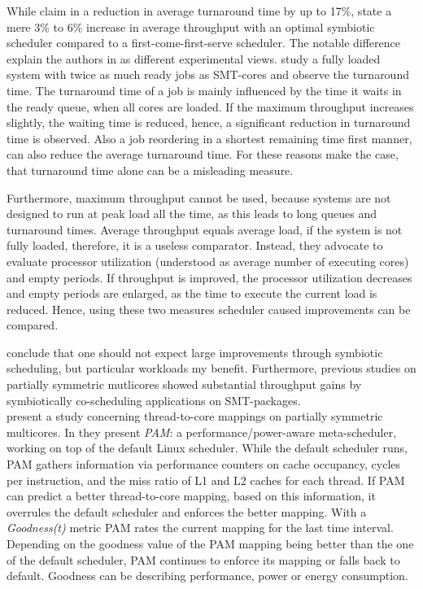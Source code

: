 While \citeauthor{snavely_symbiotic_2000} claim in
\cite{snavely_symbiotic_2000} a reduction in average turnaround time by up to
17\%, \citeauthor{eyerman_revisiting_2015} state a mere 3\% to 6\% increase in
average throughput with an optimal symbiotic scheduler compared to a
first-come-first-serve scheduler.
The notable difference explain the authors in \cite{eyerman_revisiting_2015} as
different experimental views. \citeauthor{snavely_symbiotic_2000} study a fully
loaded system with twice as much ready jobs as SMT-cores and observe the
turnaround time.
The turnaround time of a job is mainly influenced by the time it waits in the
ready queue, when all cores are loaded.
If the maximum throughput increases slightly, the waiting time is reduced,
hence, a significant reduction in turnaround time is observed.
Also a job reordering in a shortest remaining time first manner, can also
reduce the average turnaround time.
For these reasons \citeauthor{eyerman_revisiting_2015} make the case,
that turnaround time alone can be a misleading measure.

Furthermore, maximum throughput cannot be used, because systems are not
designed to run at peak load all the time, as this leads to long queues and
turnaround times.
Average throughput equals average load, if the system is not fully loaded,
therefore, it is a useless comparator.
Instead, they advocate to evaluate processor utilization (understood as average
number of executing cores) and empty periods.
If throughput is improved, the processor utilization decreases and empty
periods are enlarged, as the time to execute the current load is reduced.
Hence, using these two measures scheduler caused improvements can be compared.

\citeauthor{eyerman_revisiting_2015} conclude that one should not expect large
improvements through symbiotic scheduling, but particular workloads my benefit.
Furthermore, previous studies on partially symmetric mutlicores showed
substantial throughput gains by symbiotically co-scheduling applications on
SMT-packages.
\\


\citeauthor{banikazemi_pam_2008} present a study concerning thread-to-core
mappings on partially symmetric multicores.
In \cite{banikazemi_pam_2008} they present \emph{PAM}: a performance/power-aware
meta-scheduler, working on top of the default Linux scheduler.
While the default scheduler runs, PAM gathers information via performance
counters on cache occupancy, cycles per instruction, and the miss ratio of L1
and L2 caches for each thread.
If PAM can predict a better thread-to-core mapping, based on this information,
it overrules the default scheduler and enforces the better mapping.
With a \textit{Goodness(t)} metric PAM rates the current mapping for the last
time interval.
Depending on the goodness value of the PAM mapping being better than the one of
the default scheduler, PAM continues to enforce its mapping or falls back to
default.
Goodness can be describing performance, power or energy consumption.

